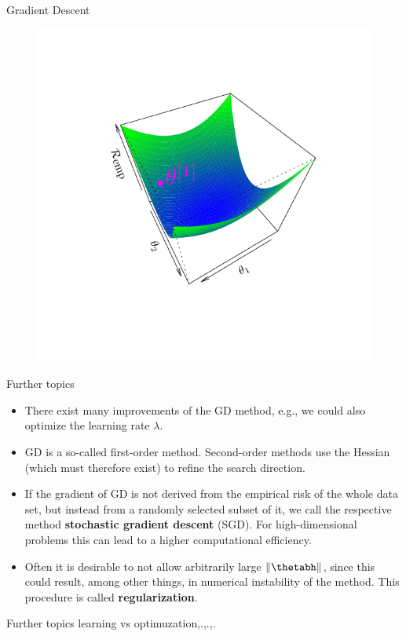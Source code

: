 \documentclass[11pt,compress,t,notes=noshow, xcolor=table]{beamer}
\begin{document}
\begin{vbframe}{Gradient Descent}
\begin{figure}[!htb]
\endminipage\hfill
{}%
  \includegraphics[trim=2cm 2cm 2cm 2cm, width=\linewidth]{figure/grad_desc3}
\endminipage
\end{figure}

\end{vbframe}
\begin{vbframe}{Further topics}
\begin{itemize}
\item There exist many improvements of the GD method, e.g., we could also optimize the learning rate $\lambda$.
\item GD is a so-called first-order method. Second-order methods use the Hessian (which must therefore exist) to refine the search direction.
\item If the gradient of GD is not derived from the empirical risk of the whole data set, but instead from a randomly selected subset of it, we call the respective method \textbf{stochastic gradient descent} (SGD). For high-dimensional problems this can lead to a higher computational efficiency.
\item Often it is desirable to not allow arbitrarily large $\Vert \thetabh \Vert$, since this could result, among other things, in numerical instability of the method. This procedure is called \textbf{regularization}.
\end{itemize}
\end{vbframe}


\begin{vbframe}{Further topics}
    learning vs optimuzation,.,.,.
\end{vbframe}


\endlecture
\end{document}
